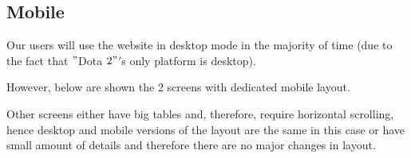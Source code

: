     \clearpage

    \subsection{Mobile}

    Our users will use the website in desktop mode in the majority of time (due to the fact that \("\)Dota \(2"\)\('\)s only platform is desktop).

    \vspace{1em}
    However, below are shown the 2 screens with dedicated mobile layout.

    \vspace{1em}
    Other screens either have big tables and, therefore, require horizontal scrolling, hence desktop and mobile versions of the layout are the same in this case
    or have small amount of details and therefore there are no major changes in layout.

